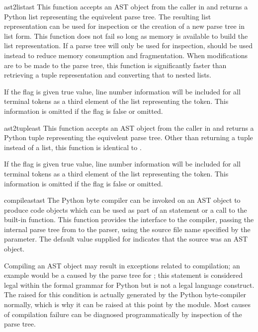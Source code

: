 \begin{funcdesc}{ast2list}{ast}
This function accepts an AST object from the caller in
 and returns a Python list representing the
equivelent parse tree.  The resulting list representation can be used
for inspection or the creation of a new parse tree in list form.
This function does not fail so long as memory is available to build
the list representation.  If a parse tree will only be used for
inspection,  should be used instead to reduce memory
consumption and fragmentation.  When modifications are to be made to
the parse tree, this function is significantly faster than retrieving
a tuple representation and converting that to nested lists.

If the  flag is given true value, line number
information will be included for all terminal tokens as a third
element of the list representing the token.  This information is
omitted if the flag is false or omitted.
\end{funcdesc}

\begin{funcdesc}{ast2tuple}{ast}
This function accepts an AST object from the caller in
 and returns a Python tuple representing the
equivelent parse tree.  Other than returning a tuple instead of a
list, this function is identical to .

If the  flag is given true value, line number
information will be included for all terminal tokens as a third
element of the list representing the token.  This information is
omitted if the flag is false or omitted.
\end{funcdesc}

\begin{funcdesc}{compileast}{ast}
The Python byte compiler can be invoked on an AST object to produce
code objects which can be used as part of an  statement or
a call to the built-in  function.  This function provides
the interface to the compiler, passing the internal parse tree from
 to the parser, using the source file name specified
by the  parameter.  The default value supplied
for  indicates that the source was an AST object.

Compiling an AST object may result in exceptions related to
compilation; an example would be a  caused by the
parse tree for ; this statement is considered legal
within the formal grammar for Python but is not a legal language
construct.  The  raised for this condition is
actually generated by the Python byte-compiler normally, which is why
it can be raised at this point by the  module.  Most
causes of compilation failure can be diagnosed programmatically by
inspection of the parse tree.
\end{funcdesc}


